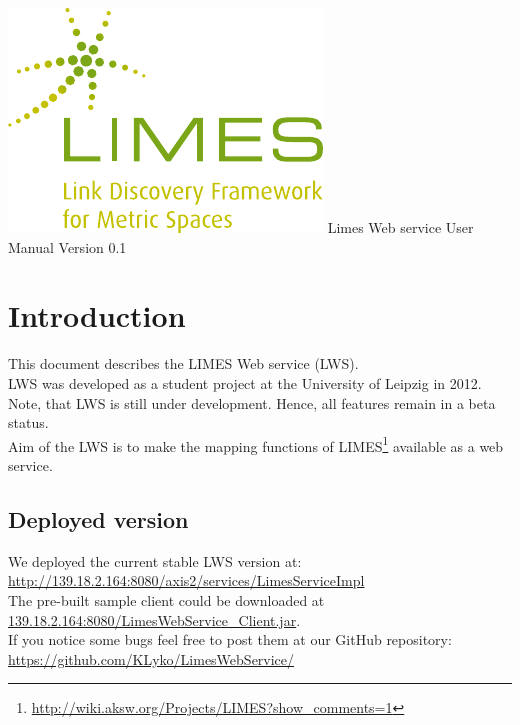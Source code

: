 \documentclass{article}
\begin{document}
\begin{titlepage}
	\begin{center}
		\includegraphics[width=\textwidth]{images/limes_logo.pdf}
		\centering
		\huge Limes Web service User Manual
		\huge Version 0.1	
		\vfill
	\end{center}
\end{titlepage}
\tableofcontents
\newpage
\section{Introduction}
This document describes the LIMES Web service (LWS).\\
LWS was developed as a student project at the University of Leipzig in 2012. Note, that LWS is still under development. Hence, all features remain in a beta status. \\
Aim of the LWS is to make the mapping functions of LIMES\footnote{\url{http://wiki.aksw.org/Projects/LIMES?show_comments=1}} available as a web service.

\subsection{Deployed version}
We deployed the current stable LWS version at: \url{http://139.18.2.164:8080/axis2/services/LimesServiceImpl} \\
The pre-built sample client could be downloaded at \url{139.18.2.164:8080/LimesWebService_Client.jar}.\\
If you notice some bugs feel free to post them at our GitHub repository: \url{https://github.com/KLyko/LimesWebService/}
\end{document}
